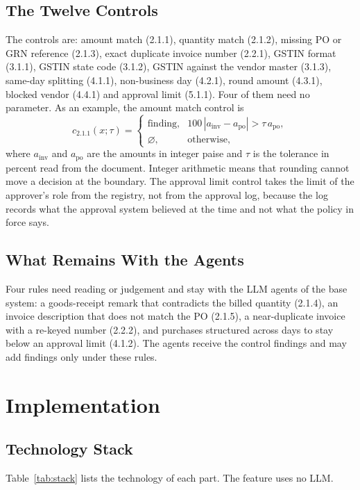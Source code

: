 \documentclass[conference]{IEEEtran}
\begin{document}
\subsection{The Twelve Controls}
The controls are: amount match (2.1.1), quantity match (2.1.2), missing PO or GRN reference (2.1.3), exact duplicate invoice number (2.2.1), GSTIN format (3.1.1), GSTIN state code (3.1.2), GSTIN against the vendor master (3.1.3), same-day splitting (4.1.1), non-business day (4.2.1), round amount (4.3.1), blocked vendor (4.4.1) and approval limit (5.1.1). Four of them need no parameter. As an example, the amount match control is
\begin{equation}
c_{2.1.1}(x;\tau)=
\begin{cases}
\text{finding}, & 100\,|a_{\mathrm{inv}}-a_{\mathrm{po}}| > \tau\,a_{\mathrm{po}},\\
\varnothing, & \text{otherwise},
\end{cases}
\label{eq:amount}
\end{equation}
where $a_{\mathrm{inv}}$ and $a_{\mathrm{po}}$ are the amounts in integer paise and $\tau$ is the tolerance in percent read from the document. Integer arithmetic means that rounding cannot move a decision at the boundary. The approval limit control takes the limit of the approver's role from the registry, not from the approval log, because the log records what the approval system believed at the time and not what the policy in force says.

\subsection{What Remains With the Agents}
Four rules need reading or judgement and stay with the LLM agents of the base system: a goods-receipt remark that contradicts the billed quantity (2.1.4), an invoice description that does not match the PO (2.1.5), a near-duplicate invoice with a re-keyed number (2.2.2), and purchases structured across days to stay below an approval limit (4.1.2). The agents receive the control findings and may add findings only under these rules.

\section{Implementation}
\label{sec:impl}
\subsection{Technology Stack}
Table~\ref{tab:stack} lists the technology of each part. The feature uses no LLM.
\end{document}
